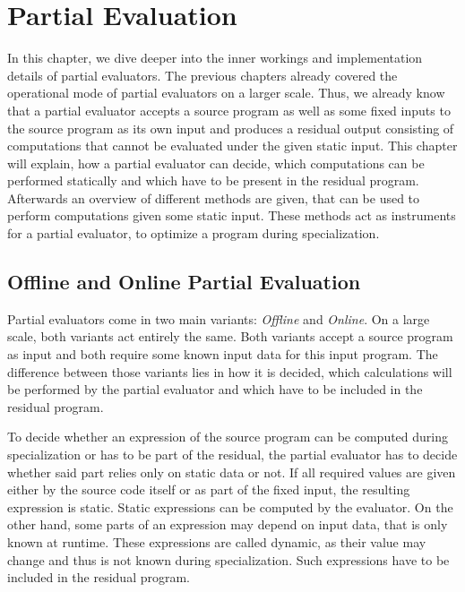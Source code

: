 
\section{Partial Evaluation}\label{sec:partial-evaluation}

In this chapter, we dive deeper into the inner workings and implementation details of partial evaluators.
The previous chapters already covered the operational mode of partial evaluators on a larger scale.
Thus, we already know that a partial evaluator accepts a source program as well as some fixed inputs to the source program as its own input and produces a residual output consisting of computations that cannot be evaluated under the given static input.
This chapter will explain, how a partial evaluator can decide, which computations can be performed statically and which have to be present in the residual program.
Afterwards an overview of different methods are given, that can be used to perform computations given some static input.
These methods act as instruments for a partial evaluator, to optimize a program during specialization.


\subsection{Offline and Online Partial Evaluation}\label{sec:offline-vs-online}

Partial evaluators come in two main variants: \textit{Offline} and \textit{Online}.
On a large scale, both variants act entirely the same.
Both variants accept a source program as input and both require some known input data for this input program.
The difference between those variants lies in how it is decided, which calculations will be performed by the partial evaluator and which have to be included in the residual program.

To decide whether an expression of the source program can be computed during specialization or has to be part of the residual, the partial evaluator has to decide whether said part relies only on static data or not.
If all required values are given either by the source code itself or as part of the fixed input, the resulting expression is static.
Static expressions can be computed by the evaluator.
On the other hand, some parts of an expression may depend on input data, that is only known at runtime.
These expressions are called dynamic, as their value may change and thus is not known during specialization.
Such expressions have to be included in the residual program.

